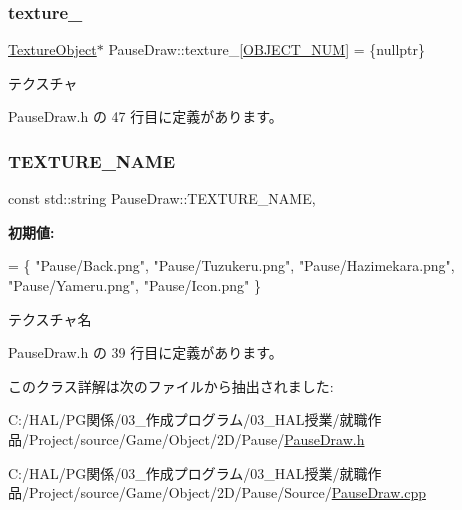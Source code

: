 \mbox{\label{class_pause_draw_a53aa88e9354415d77212221e361a1f99}} 
\subsubsection{\texorpdfstring{texture\+\_\+}{texture\_}}
{\footnotesize\ttfamily \mbox{\hyperlink{class_texture_object}{Texture\+Object}}$\ast$ Pause\+Draw\+::texture\+\_\+\mbox{[}\mbox{\hyperlink{class_pause_draw_a28303189f2f9cf000bd8f2ca9d55ee05}{O\+B\+J\+E\+C\+T\+\_\+\+N\+UM}}\mbox{]} = \{nullptr\}\hspace{0.3cm}{\ttfamily [private]}}



テクスチャ 



 Pause\+Draw.\+h の 47 行目に定義があります。

\mbox{\label{class_pause_draw_adf998344d92e63fa3bfbac4b1ec93c51}} 
\subsubsection{\texorpdfstring{T\+E\+X\+T\+U\+R\+E\+\_\+\+N\+A\+ME}{TEXTURE\_NAME}}
{\footnotesize\ttfamily const std\+::string Pause\+Draw\+::\+T\+E\+X\+T\+U\+R\+E\+\_\+\+N\+A\+ME\hspace{0.3cm}{\ttfamily [static]}, {\ttfamily [private]}}

{\bfseries 初期値\+:}
\begin{DoxyCode}
=
\{
    \textcolor{stringliteral}{"Pause/Back.png"},
    \textcolor{stringliteral}{"Pause/Tuzukeru.png"},
    \textcolor{stringliteral}{"Pause/Hazimekara.png"},
    \textcolor{stringliteral}{"Pause/Yameru.png"},
    \textcolor{stringliteral}{"Pause/Icon.png"}
\}
\end{DoxyCode}


テクスチャ名 



 Pause\+Draw.\+h の 39 行目に定義があります。



このクラス詳解は次のファイルから抽出されました\+:\begin{DoxyCompactItemize}
\item 
C\+:/\+H\+A\+L/\+P\+G関係/03\+\_\+作成プログラム/03\+\_\+\+H\+A\+L授業/就職作品/\+Project/source/\+Game/\+Object/2\+D/\+Pause/\mbox{\hyperlink{_pause_draw_8h}{Pause\+Draw.\+h}}\item 
C\+:/\+H\+A\+L/\+P\+G関係/03\+\_\+作成プログラム/03\+\_\+\+H\+A\+L授業/就職作品/\+Project/source/\+Game/\+Object/2\+D/\+Pause/\+Source/\mbox{\hyperlink{_pause_draw_8cpp}{Pause\+Draw.\+cpp}}\end{DoxyCompactItemize}
